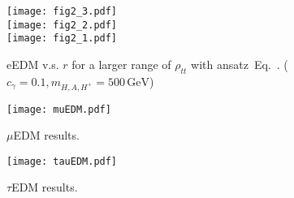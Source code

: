 \begin{figure}[p]
    \centering
    \texttt{[image: fig2\_3.pdf]}\\
    \texttt{[image: fig2\_2.pdf]}\\
    \texttt{[image: fig2\_1.pdf]}
    \caption{eEDM v.s. \(r \) for a larger range of \(\rho_{tt} \) with ansatz~Eq.~. (\(c_{\gamma} = 0.1, m_{H, A, H^+} = 500\,\mathrm{GeV} \))}
    \label{fig:eEDM}
\end{figure}

\begin{figure}[p]
    \centering
    \texttt{[image: muEDM.pdf]}
    \caption{\(\mu \)EDM results.}
    \label{fig:muEDM}
\end{figure}

\begin{figure}[p]
    \centering
    \texttt{[image: tauEDM.pdf]}
    \caption{\(\tau \)EDM results.}
    \label{fig:tauEDM}
\end{figure}